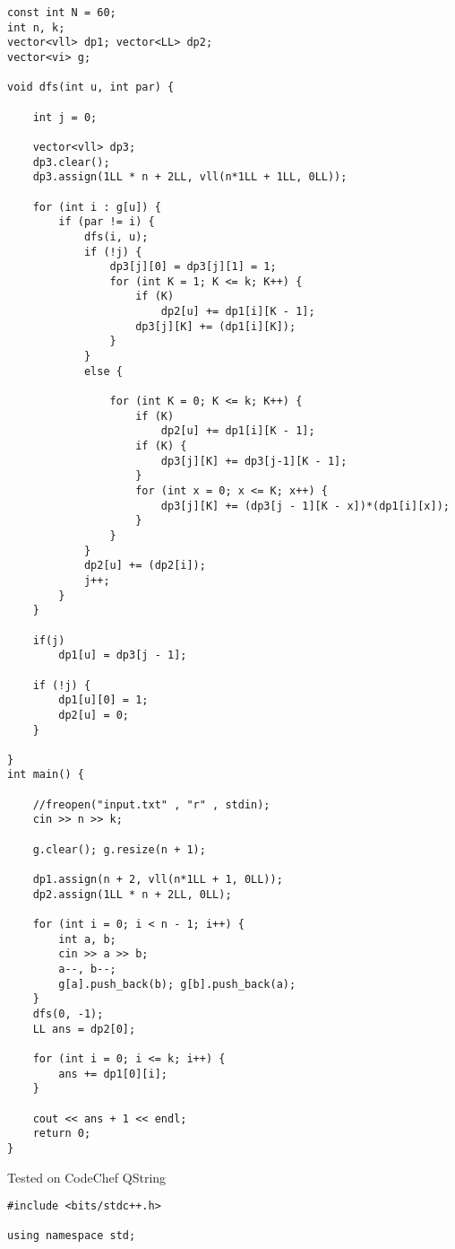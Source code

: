 \documentclass[10pt,a4paper]{report}
\begin{document}
\begin{landscape}
\begin{multicols}{2}
\begin{verbatim}
const int N = 60; 
int n, k;
vector<vll> dp1; vector<LL> dp2; 
vector<vi> g;

void dfs(int u, int par) {
	
	int j = 0;

	vector<vll> dp3; 
	dp3.clear(); 
	dp3.assign(1LL * n + 2LL, vll(n*1LL + 1LL, 0LL));

	for (int i : g[u]) {
		if (par != i) {
			dfs(i, u);
			if (!j) {
				dp3[j][0] = dp3[j][1] = 1; 
				for (int K = 1; K <= k; K++) {
					if (K)
						dp2[u] += dp1[i][K - 1];
					dp3[j][K] += (dp1[i][K]);
				}
			}
			else {
				
				for (int K = 0; K <= k; K++) {
					if (K)
						dp2[u] += dp1[i][K - 1];
					if (K) {
						dp3[j][K] += dp3[j-1][K - 1]; 
					}
					for (int x = 0; x <= K; x++) {
						dp3[j][K] += (dp3[j - 1][K - x])*(dp1[i][x]);
					}
				}
			}
			dp2[u] += (dp2[i]);
			j++; 
		}
	}
	 
	if(j)
		dp1[u] = dp3[j - 1]; 

	if (!j) {
		dp1[u][0] = 1; 
		dp2[u] = 0; 
	}

}
int main() {
    
    //freopen("input.txt" , "r" , stdin); 
	cin >> n >> k; 

	g.clear(); g.resize(n + 1);
	
	dp1.assign(n + 2, vll(n*1LL + 1, 0LL)); 
	dp2.assign(1LL * n + 2LL, 0LL);

	for (int i = 0; i < n - 1; i++) {
		int a, b; 
		cin >> a >> b; 
		a--, b--; 
		g[a].push_back(b); g[b].push_back(a); 
	}
	dfs(0, -1); 
	LL ans = dp2[0]; 

	for (int i = 0; i <= k; i++) {
        ans += dp1[0][i]; 
	}

	cout << ans + 1 << endl; 
	return 0; 
}
\end{verbatim}

\begin{flushleft}
Tested on CodeChef QString\\
\end{flushleft}

\begin{verbatim}
#include <bits/stdc++.h>
 
using namespace std;
 

\end{verbatim}
\end{multicols}
\end{landscape}
\end{document}
